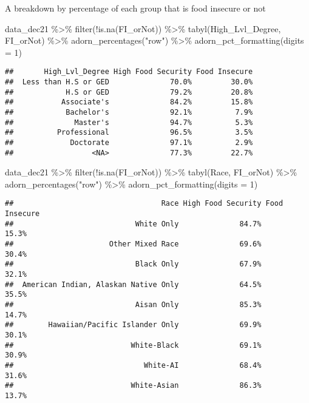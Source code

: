 \documentclass[
]{article}
\newenvironment{Shaded}{\begin{snugshade}}{\end{snugshade}}
\newcommand{\AttributeTok}[1]{\textcolor[rgb]{0.77,0.63,0.00}{#1}}
\newcommand{\DecValTok}[1]{\textcolor[rgb]{0.00,0.00,0.81}{#1}}
\newcommand{\FunctionTok}[1]{\textcolor[rgb]{0.00,0.00,0.00}{#1}}
\newcommand{\NormalTok}[1]{#1}
\newcommand{\SpecialCharTok}[1]{\textcolor[rgb]{0.00,0.00,0.00}{#1}}
\newcommand{\StringTok}[1]{\textcolor[rgb]{0.31,0.60,0.02}{#1}}
\begin{document}
A breakdown by percentage of each group that is food insecure or not

\begin{Shaded}
\begin{Highlighting}[]
\NormalTok{data\_dec21 }\SpecialCharTok{\%\textgreater{}\%} \FunctionTok{filter}\NormalTok{(}\SpecialCharTok{!}\FunctionTok{is.na}\NormalTok{(FI\_orNot)) }\SpecialCharTok{\%\textgreater{}\%} 
\FunctionTok{tabyl}\NormalTok{(High\_Lvl\_Degree, FI\_orNot) }\SpecialCharTok{\%\textgreater{}\%} 
  \FunctionTok{adorn\_percentages}\NormalTok{(}\StringTok{"row"}\NormalTok{) }\SpecialCharTok{\%\textgreater{}\%} 
  \FunctionTok{adorn\_pct\_formatting}\NormalTok{(}\AttributeTok{digits =} \DecValTok{1}\NormalTok{)}
\end{Highlighting}
\end{Shaded}

\begin{verbatim}
##       High_Lvl_Degree High Food Security Food Insecure
##  Less than H.S or GED              70.0%         30.0%
##            H.S or GED              79.2%         20.8%
##           Associate's              84.2%         15.8%
##            Bachelor's              92.1%          7.9%
##              Master's              94.7%          5.3%
##          Professional              96.5%          3.5%
##             Doctorate              97.1%          2.9%
##                  <NA>              77.3%         22.7%
\end{verbatim}

\begin{Shaded}
\begin{Highlighting}[]
\NormalTok{data\_dec21 }\SpecialCharTok{\%\textgreater{}\%} \FunctionTok{filter}\NormalTok{(}\SpecialCharTok{!}\FunctionTok{is.na}\NormalTok{(FI\_orNot)) }\SpecialCharTok{\%\textgreater{}\%} 
\FunctionTok{tabyl}\NormalTok{(Race, FI\_orNot) }\SpecialCharTok{\%\textgreater{}\%} 
  \FunctionTok{adorn\_percentages}\NormalTok{(}\StringTok{"row"}\NormalTok{) }\SpecialCharTok{\%\textgreater{}\%} 
  \FunctionTok{adorn\_pct\_formatting}\NormalTok{(}\AttributeTok{digits =} \DecValTok{1}\NormalTok{)}
\end{Highlighting}
\end{Shaded}

\begin{verbatim}
##                                  Race High Food Security Food Insecure
##                            White Only              84.7%         15.3%
##                      Other Mixed Race              69.6%         30.4%
##                            Black Only              67.9%         32.1%
##  American Indian, Alaskan Native Only              64.5%         35.5%
##                            Aisan Only              85.3%         14.7%
##        Hawaiian/Pacific Islander Only              69.9%         30.1%
##                           White-Black              69.1%         30.9%
##                              White-AI              68.4%         31.6%
##                           White-Asian              86.3%         13.7%
\end{verbatim}
\end{document}
